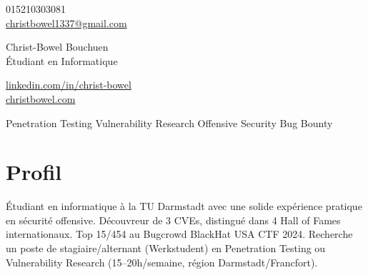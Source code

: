 \documentclass[a4paper,10pt]{article}
\begin{document}
\begin{center}
    \begin{minipage}[b]{0.30\textwidth}
            \large 015210303081 \\
            \large \href{mailto:christbowel1337@gmail.com}{christbowel1337@gmail.com} 
    \end{minipage}%
    \begin{minipage}[b]{0.40\textwidth}
            \centering
            {\Huge Christ-Bowel Bouchuen} \\ 
            \vspace{0.1cm}
            {\color{UI_blue} \Large{Étudiant en Informatique}} 
    \end{minipage}%
    \begin{minipage}[b]{0.30\textwidth}
            \flushright \large 
            \href{https://linkedin.com/in/christ-bowel-bouchuen-207a76251}{linkedin.com/in/christ-bowel} \\
            \href{https://christbowel.com}{christbowel.com}
    \end{minipage}   
    \vspace{0.1cm} 
    {\color{UI_blue} \hrulefill}
\end{center}

\vspace{-0.25cm}
\begin{center}
    \textbullet \hspace{0.1cm} Penetration Testing \hspace{0.3cm}
    \textbullet \hspace{0.1cm} Vulnerability Research \hspace{0.3cm}
    \textbullet \hspace{0.1cm} Offensive Security \hspace{0.3cm}
    \textbullet \hspace{0.1cm} Bug Bounty
\end{center}

\section{Profil}
Étudiant en informatique à la TU Darmstadt avec une solide expérience pratique en sécurité offensive. Découvreur de 3 CVEs, distingué dans 4 Hall of Fames internationaux. Top 15/454 au Bugcrowd BlackHat USA CTF 2024. Recherche un poste de stagiaire/alternant (Werkstudent) en Penetration Testing ou Vulnerability Research (15--20h/semaine, région Darmstadt/Francfort).
\end{document}
